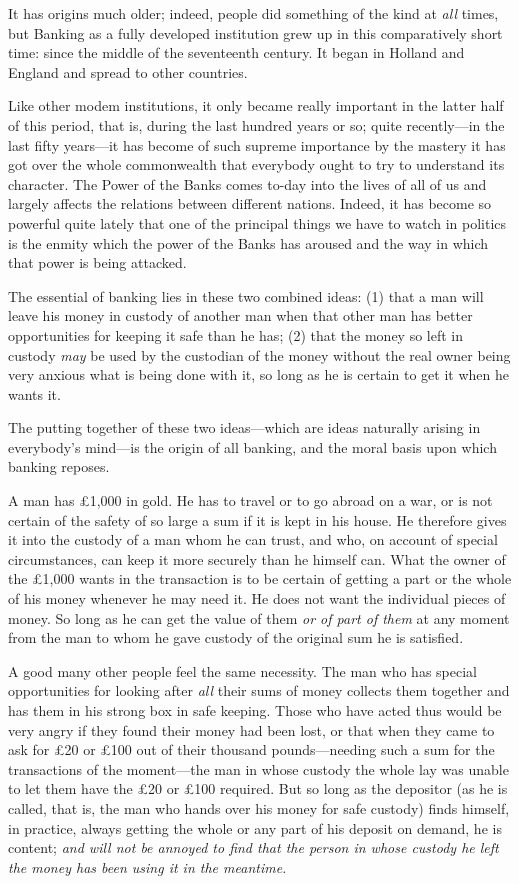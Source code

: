 \documentclass{book}
\begin{document}
It has origins much older; indeed, people did something of the kind at \emph{all} times, but Banking as a fully developed institution grew up in this comparatively short time: since the middle of the seventeenth century. It began in Holland and England and spread to other countries.

Like other modem institutions, it only became really important in the latter half of this period, that is, during the last hundred years or so; quite recently—in the last fifty years—it has become of such supreme importance by the mastery it has got over the whole commonwealth that everybody ought to try to understand its character. The Power of the Banks comes to-day into the lives of all of us and largely affects the relations between different nations. Indeed, it has become so powerful quite lately that one of the principal things we have to watch in politics is the enmity which the power of the Banks has aroused and the way in which that power is being attacked.

The essential of banking lies in these two combined ideas: (1) that a man will leave his money in custody of another man when that other man has better opportunities for keeping it safe than he has; (2) that the money so left in custody \emph{may} be used by the custodian of the money without the real owner being very anxious what is being done with it, so long as he is certain to get it when he wants it.

The putting together of these two ideas—which are ideas naturally arising in everybody’s mind—is the origin of all banking, and the moral basis upon which banking reposes.

A man has £1,000 in gold. He has to travel or to go abroad on a war, or is not certain of the safety of so large a sum if it is kept in his house. He therefore gives it into the custody of a man whom he can trust, and who, on account of special circumstances, can keep it more securely than he himself can. What the owner of the £1,000 wants in the transaction is to be certain of getting a part or the whole of his money whenever he may need it. He does not want the individual pieces of money. So long as he can get the value of them \emph{or of part of them} at any moment from the man to whom he gave custody of the original sum he is satisfied.

A good many other people feel the same necessity. The man who has special opportunities for looking after \emph{all} their sums of money collects them together and has them in his strong box in safe keeping. Those who have acted thus would be very angry if they found their money had been lost, or that when they came to ask for £20 or £100 out of their thousand pounds—needing such a sum for the transactions of the moment—the man in whose custody the whole lay was unable to let them have the £20 or £100 required. But so long as the depositor (as he is called, that is, the man who hands over his money for safe custody) finds himself, in practice, always getting the whole or any part of his deposit on demand, he is content; \emph{and will not be annoyed to find that the person in whose custody he left the money has been using it in the meantime.}
\end{document}
